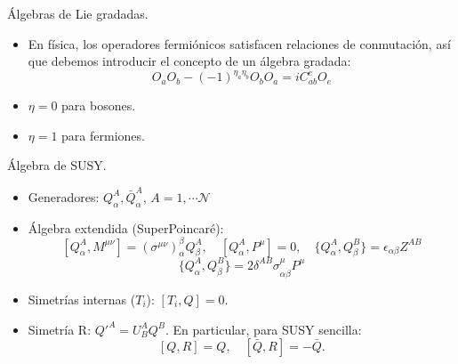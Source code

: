 \documentclass[10pt,a4paper]{beamer}
\begin{document}
\begin{frame}{Álgebras de Lie gradadas.}
  \begin{itemize}
    \item En física, los operadores fermiónicos satisfacen relaciones de
      conmutación, así que debemos introducir el concepto de un álgebra gradada:
\[
  O_aO_b - (-1)^{\eta_a\eta_b} O_bO_a = iC^e_{ab} O_e
\]
\item $\eta =0$  para bosones.
\item $\eta = 1$ para fermiones.
\end{itemize}
\end{frame}

\begin{frame}{Álgebra de SUSY.}
  \begin{itemize}
    \item Generadores: $Q^A_\alpha,\bar
Q^A_{\dot\alpha}$, $A=1,\cdots\mathcal{N}$ 
\item Álgebra extendida (SuperPoincaré):
  \[
  \left[Q^A_\alpha, M^{\mu\nu} \right] = 
\left(\sigma^{\mu\nu} \right)
  _\alpha^\beta  Q^A_\beta, \quad
\left[Q^A_\alpha, P^{\mu} \right] =0, \quad
\{Q^A_\alpha, Q^B_\beta \}
  =
\epsilon_{\alpha\beta} Z^{AB}
\]
\[\{Q^A_\alpha, Q^B_{\dot\beta} \} = 2 \delta^{AB}\sigma^\mu_{\alpha\dot\beta}P^\mu\]

\item Simetrías internas ($T_i$): $[T_i,Q] =0$.
\item Simetría R: $Q'^A = U^A_BQ^B$. En particular, para SUSY sencilla:
\[
[Q,R] = Q, \quad[\bar Q,R] = - \bar Q.
\]
  \end{itemize}
\end{frame}

\end{document}
